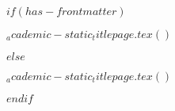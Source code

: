 $if(has-frontmatter)$
  \begin{frontmatter}
    \begin{titlepage}
      $_academic-static_titlepage.tex()$
    \end{titlepage}
  \end{frontmatter}
$else$
  \begin{titlepage}
    $_academic-static_titlepage.tex()$
  \end{titlepage}
$endif$
